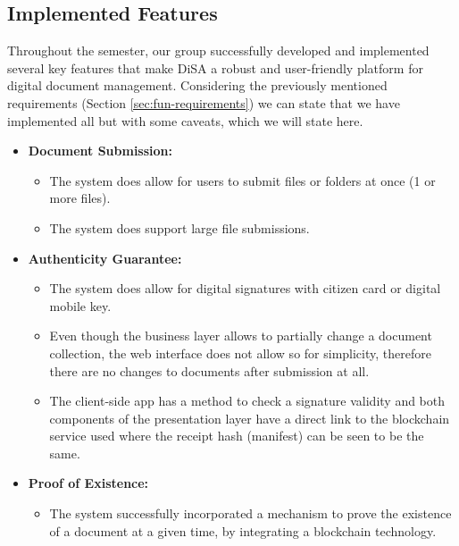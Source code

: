 \documentclass[a4paper,11pt]{article}
\begin{document}
        \subsection{Implemented Features}
            \quad Throughout the semester, our group successfully developed and implemented several key features that make DiSA a robust and user-friendly platform for digital document management. Considering the previously mentioned requirements (Section \ref{sec:fun-requirements}) we can state that we have implemented all but with some caveats, which we will state here.
            \begin{itemize}
                \item \textbf{Document Submission:} 
                    \begin{itemize}
                        \item The system does allow for users to submit files or folders at once (1 or more files).
                        \item The system does support large file submissions.
                    \end{itemize}
                    
                \pagebreak
                \item \textbf{Authenticity Guarantee:} 
                    \begin{itemize}
                        \item The system does allow for digital signatures with citizen card or digital mobile key.
                        \item Even though the business layer allows to partially change a document collection, the web interface does not allow so for simplicity, therefore there are no changes to documents after submission at all.
                        \item The client-side app has a method to check a signature validity and both components of the presentation layer have a direct link to the blockchain service used where the receipt hash (manifest) can be seen to be the same.
                        \end{itemize}
                        
                \item \textbf{Proof of Existence:} 
                \begin{itemize}
                    \item The system successfully incorporated a mechanism to prove the existence of a document at a given time, by integrating a blockchain technology. 
                \end{itemize}
                        

\end{itemize}
\end{document}
